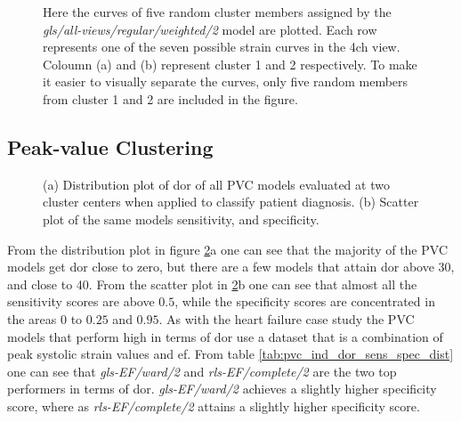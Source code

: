 \clearpage

\begin{figure}[ht]
    \centering
    
    \caption{Here the curves of five random cluster members assigned by the \textit{gls/all-views/regular/weighted/2} model are plotted.
             Each row represents one of the seven possible strain curves in the \acrshort{4ch} view. Coloumn (a) and (b) represent cluster 1 and 2 respectively.
             To make it easier to visually separate the curves, only five random members from cluster 1 and 2 are included in the figure.}
    \label{fig:five_members_gls_rls_4CH_regular_complete_two}
\end{figure}

\clearpage

\subsection{Peak-value Clustering}

\begin{figure}[H]
    \centering
    
    \caption{(a) Distribution plot of \acrshort{dor} of all PVC models evaluated at two cluster centers when applied to classify patient diagnosis.
             (b) Scatter plot of the same models sensitivity, and specificity.}
    \label{fig:pvc_ind_dor_sens_spec_dist}
\end{figure}

From the distribution plot in figure \ref{fig:pvc_ind_dor_sens_spec_dist}a one can see that the majority of the PVC models get \acrshort{dor} close to zero, but there are a few models that attain \acrshort{dor} above 30, and close to 40. From the scatter plot in \ref{fig:pvc_ind_dor_sens_spec_dist}b one can see that almost all the sensitivity scores are above $0.5$, while the specificity scores are concentrated in the areas $0$ to $0.25$ and $0.95$. As with the heart failure case study the PVC models that perform high in terms of \acrshort{dor} use a dataset that is a combination of peak systolic strain values and \acrshort{ef}. From table \ref{tab:pvc_ind_dor_sens_spec_dist} one can see that \textit{gls-EF/ward/2} and \textit{rls-EF/complete/2} are the two top performers in terms of \acrshort{dor}. \textit{gls-EF/ward/2} achieves a slightly higher specificity score, where as \textit{rls-EF/complete/2} attains a slightly higher specificity score.

